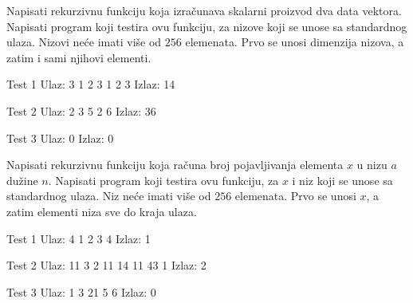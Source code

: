 \begin{Exercise}[label=110]
Napisati rekurzivnu funkciju  koja izračunava skalarni
  proizvod dva data vektora.  Napisati program koji testira ovu
  funkciju, za nizove koji se unose sa standardnog ulaza. Nizovi neće imati više od $256$ elemenata. Prvo se unosi dimenzija nizova, a zatim i sami njihovi elementi.
  
\begin{miditest}
\begin{test}{Test 1}
Ulaz:    3 1 2 3 1 2 3 
Izlaz:   14                 
\end{test}
\end{miditest}
\begin{minitest}
\begin{test}{Test 2}
Ulaz:   2 3 5 2 6       
Izlaz:  36              
\end{test}
\end{minitest}


\begin{minitest}
\begin{test}{Test 3}
Ulaz:   0
Izlaz:  0
\end{test}
\end{minitest}

\end{Exercise}
\begin{Answer}[ref=110]
\end{Answer}



\begin{Exercise}[label=112]
Napisati rekurzivnu funkciju  
  koja računa broj pojavljivanja
  elementa $x$ u nizu $a$ dužine $n$. Napisati program koji testira
  ovu funkciju, za $x$ i niz koji se unose sa standardnog
  ulaza. Niz neće imati više od $256$ elemenata. Prvo se unosi $x$, a zatim
  elementi niza sve do kraja ulaza.
  
\begin{minitest}
\begin{test}{Test 1}
Ulaz:    4 1 2 3 4     
Izlaz:   1              
\end{test}
\end{minitest}
\begin{miditest}
\begin{test}{Test 2}
Ulaz:    11 3 2 11 14 11 43 1      
Izlaz:   2                      
\end{test}
\end{miditest}

\begin{minitest}
\begin{test}{Test 3}
Ulaz:    1 3 21 5 6
Izlaz:   0    
\end{test}
\end{minitest}

\end{Exercise}
\begin{Answer}[ref=112]
\end{Answer}

